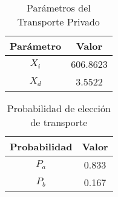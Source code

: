 \begin{table}[H]
    \centering
    \caption{Parámetros del Transporte Privado}
    \begin{tabular}{|c|c|}
    \hline
    Parámetro & Valor  \\ \hline
    $X_i$    & 606.8623     \\ \hline
    $X_{d}$    & 3.5522     \\ \hline
    \end{tabular}
    \label{tab:param}
\end{table}

\begin{table}[H]
    \centering
    \caption{Probabilidad de elección de transporte}
    \begin{tabular}{|c|c|}
    \hline
    Probabilidad & Valor  \\ \hline
    $P_{a}$    & 0.833    \\ \hline
    $P_{b}$    & 0.167     \\ \hline
    \end{tabular}
    \label{tab:prob}
\end{table}

